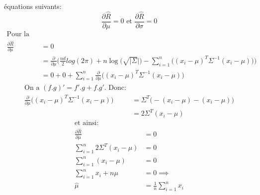 \documentclass{article}
\begin{document}
\begin{enumerate}[label=(\alph*)]
  équations suivants:
  \[
    \frac{\partial\hat{R}}{\partial \mu} = 0 \text{ et }
    \frac{\partial\hat{R}}{\partial \sigma} = 0
  \]
  \begin{align*}
    \text{Pour la moyenne:}\\
    \frac{\partial\hat{R}}{\partial \mu} &= 0 \\
                                         &=
                                           \frac{\partial}{\partial
                                           \mu}\Bigg(
                                           \frac{nd}{2}log{{(2 \pi)+
                                           n\log(\sqrt{|\Sigma}|})
                                           }-\sum_{i=1}^{n}\Big(
                                           (x_i - \mu)^T\Sigma^{-1}(x_i-\mu)
                                           \Big)                                            
                                           \Bigg)\\
                                         &= 0 + 0 + \sum_{i=1}^{n} \frac{\partial}{\partial
                                           \mu}\Big(
                                           (x_i - \mu)^T\Sigma^{-1}(x_i-\mu)
                                           \Big)
  \end{align*}
  \begin{align*}
    \text{On a } (f.g)' = f'.g + f.g' \text{. Donc:}\\
    \frac{\partial}{\partial
    \mu}\Big((x_i - \mu)^T\Sigma^{-1}(x_i-\mu)\Big) &=
                                                      \Sigma^T\big(
                                                      -(x_i - \mu)-(x_i - \mu)
                                                      \big)\\
                                                    &= 2\Sigma^T(x_i - \mu)
  \end{align*}
  \begin{align*}
    \text{et ainsi:}\\
    \frac{\partial\hat{R}}{\partial \mu} &= 0\\
    \sum_{i=1}^{n}{2\Sigma^T(x_i - \mu)} & = 0\\
    \sum_{i=1}^{n}{(x_i - \mu)} & = 0\\
    \sum_{i=1}^{n}x_i + n\mu & = 0 \implies \\
    \hat{\mu} & = \frac{1}{n}\sum_{i=1}^{n}x_i\\
  \end{align*}


\end{enumerate}
\end{document}
